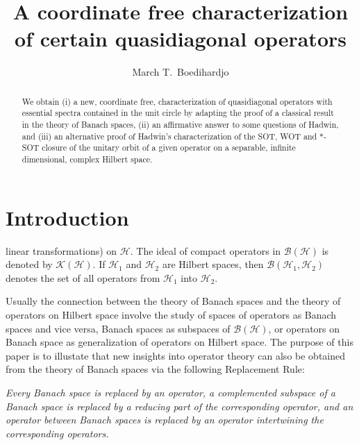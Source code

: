 \documentclass[11pt]{amsart}
\theoremstyle{definition}
\numberwithin{equation}{section}
\begin{document}
\title{A coordinate free characterization of certain quasidiagonal operators}
\author{March T.~Boedihardjo}
\address{Department of Mathematics, Texas A\&M University, College Station, Texas 77843}
\begin{abstract}
We obtain (i) a new, coordinate free, characterization of quasidiagonal operators with essential spectra contained in the unit circle by adapting the proof of a classical
result in the theory of Banach spaces, (ii) an affirmative answer to some questions of Hadwin, and (iii) an alternative proof of Hadwin's characterization of the SOT, WOT
and $*$-SOT closure of the unitary orbit of a given operator on a separable, infinite dimensional, complex Hilbert space.
\end{abstract}
\maketitle
\allowdisplaybreaks
\section{Introduction}\label{1}
linear transformations) on $\mathcal{H}$. The ideal of compact operators in $\mathcal{B(H)}$ is denoted by $\mathcal{K(H)}$. If $\mathcal{H}_{1}$ and $\mathcal{H}_{2}$ are
Hilbert spaces, then $\mathcal{B}(\mathcal{H}_{1},\mathcal{H}_{2})$ denotes the set of all operators from $\mathcal{H}_{1}$ into $\mathcal{H}_{2}$.

Usually the connection between the theory of Banach spaces and the theory of operators on Hilbert space involve the study of spaces of operators as Banach spaces and vice
versa, Banach spaces as subspaces of $\mathcal{B(H)}$, or operators on Banach space as generalization of operators on Hilbert space. The purpose of this paper is to
illustate that new insights into operator theory can also be obtained from the theory of Banach spaces via the following Replacement Rule:

{\it Every Banach space is replaced by an operator, a complemented subspace of a Banach space is replaced by a reducing part of the corresponding operator, and an operator
between Banach spaces is replaced by an operator intertwining the corresponding operators.}
\end{document}
